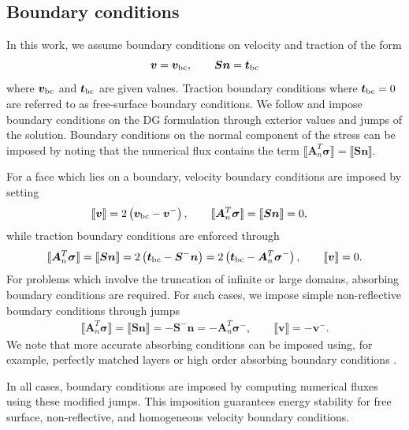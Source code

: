 \documentclass{siamart0216}
\newcommand{\LRp}[1]{\left( #1 \right)}
\newcommand{\jump}[1] {\ensuremath{\llbracket#1\rrbracket}}
\begin{document}
\subsection{Boundary conditions}

In this work, we assume boundary conditions on velocity and traction of the form
\[
\bm{v} = \bm{v}_{\rm bc}, \qquad \bm{S}\bm{n} = \bm{t}_{\rm bc}
\]
where $\bm{v}_{\rm bc}$ and $\bm{t}_{\rm bc}$ are given values.  Traction boundary conditions where $\bm{t}_{\rm bc} = 0$ are referred to as free-surface boundary conditions.  We follow \cite{leveque2002finite,wilcox2010high} and impose boundary conditions on the DG formulation through exterior values and jumps of the solution.  Boundary conditions on the normal component of the stress can be imposed by noting that the numerical flux contains the term $\jump{\bm{A}_n^T\bm{\sigma}} = \jump{\bm{S}\bm{n}}$.  

For a face which lies on a boundary, velocity boundary conditions are imposed by setting 
\begin{align*}
\jump{\bm{v}} &= 2\LRp{\bm{v}_{\rm bc} - \bm{v}^- }, \qquad \jump{\bm{A}_n^T\bm{\sigma}}=\jump{\bm{S}\bm{n}} = 0, 
\end{align*}
while traction boundary conditions are enforced through
\begin{align*}
\jump{\bm{A}_n^T\bm{\sigma}} = \jump{\bm{S}\bm{n}} = 2\LRp{\bm{t}_{\rm bc} - \bm{S}^-\bm{n} }= 2\LRp{\bm{t}_{\rm bc} - \bm{A}_n^T\bm{\sigma}^- }, \qquad \jump{\bm{v}} = 0.
\end{align*}
For problems which involve the truncation of infinite or large domains, absorbing boundary conditions are required.  For such cases, we impose simple non-reflective boundary conditions \cite{leveque2002finite} through jumps 
\begin{align*}
\jump{\bm{A}_n^T\bm{\sigma}} = \jump{\bm{S}\bm{n}} = - \bm{S}^-\bm{n} = -\bm{A}_n^T\bm{\sigma}^- , \qquad \jump{\bm{v}} = - \bm{v}^-. 
\end{align*}
We note that more accurate absorbing conditions can be imposed using, for example, perfectly matched layers \cite{berenger1994perfectly} or high order absorbing boundary conditions \cite{hagstrom2004new,modave2016high}.  

In all cases, boundary conditions are imposed by computing numerical fluxes using these modified jumps.  This imposition guarantees energy stability for free surface, non-reflective, and homogeneous velocity boundary conditions.  

\end{document}
